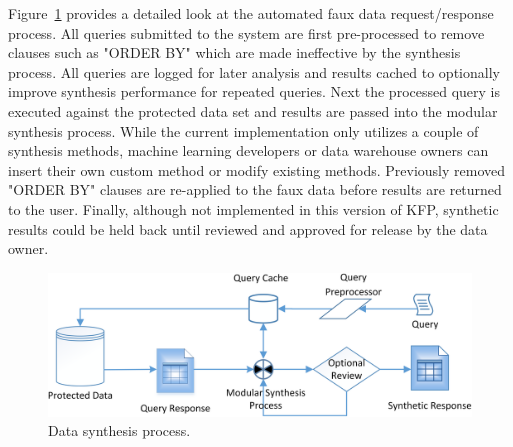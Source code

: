 \documentclass{article}
\begin{document}
Figure~\ref{fig:synthesis_process} provides a detailed look at the automated faux data request/response process. All queries submitted to the system are first pre-processed to remove clauses such as "ORDER BY" which are made ineffective by the synthesis process. All queries are logged for later analysis and results cached to optionally improve synthesis performance for repeated queries. Next the processed query is executed against the protected data set and results are passed into the modular synthesis process. While the current implementation only utilizes a couple of synthesis methods, machine learning developers or data warehouse owners can insert their own custom method or modify existing methods. Previously removed "ORDER BY" clauses are re-applied to the faux data before results are returned to the user. Finally, although not implemented in this version of KFP, synthetic results could be held back until reviewed and approved for release by the data owner.


\begin{figure}[ht]
  \centering
  \includegraphics[width=120mm]{data_synthesis_process}
  \caption{Data synthesis process.}
  \label{fig:synthesis_process}
\end{figure}
\end{document}
